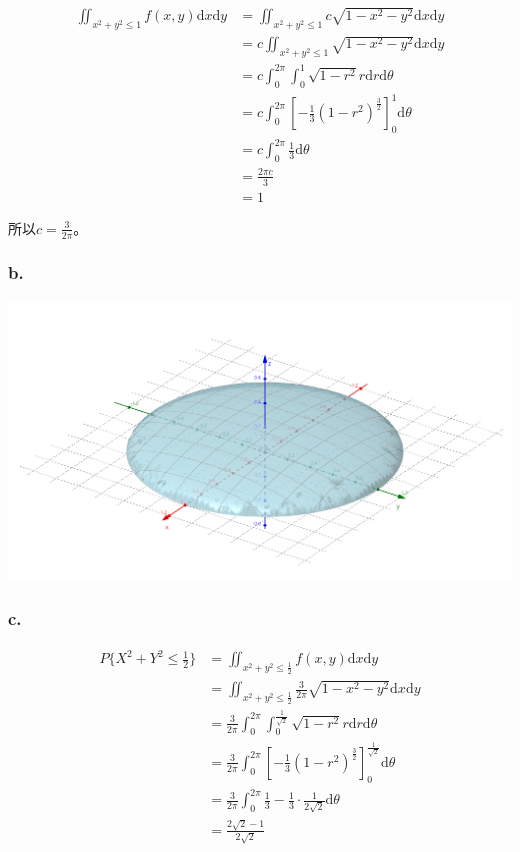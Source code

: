 \documentclass[a4paper,12pt]{ctexart}
\begin{document}
\begin{align*}
	\iint_{x^2 + y^2 \leq 1} f(x,y) \mathrm{d}x \mathrm{d}y &= \iint_{x^2 + y^2 \leq 1} c \sqrt{1 - x^2 - y^2} \mathrm{d}x \mathrm{d}y \\
	&= c \iint_{x^2 + y^2 \leq 1} \sqrt{1 - x^2 - y^2} \mathrm{d}x \mathrm{d}y \\
	&= c \int_{0}^{2\pi} \int_{0}^{1} \sqrt{1 - r^2} r \mathrm{d}r \mathrm{d}\theta \\
	&= c \int_{0}^{2\pi} \left[-\frac{1}{3} (1 - r^2)^{\frac{3}{2}}\right]_{0}^{1} \mathrm{d}\theta \\
	&= c \int_{0}^{2\pi} \frac{1}{3} \mathrm{d}\theta \\
	&= \frac{2\pi c}{3} \\
	&= 1
\end{align*}

所以$c = \frac{3}{2\pi}$。

\subsubsection*{b.}

\begin{center}
	\includegraphics[width = \textwidth]{3D-plot.png}
\end{center}

\subsubsection*{c.}

\begin{align*}
	P\{X^2 + Y^2 \leq \frac{1}{2}\} &= \iint_{x^2 + y^2 \leq \frac{1}{2}} f(x,y) \mathrm{d}x \mathrm{d}y \\
	&= \iint_{x^2 + y^2 \leq \frac{1}{2}} \frac{3}{2\pi} \sqrt{1 - x^2 - y^2} \mathrm{d}x \mathrm{d}y \\
	&= \frac{3}{2\pi} \int_{0}^{2\pi} \int_{0}^{\frac{1}{\sqrt{2}}} \sqrt{1 - r^2} r \mathrm{d}r \mathrm{d}\theta \\
	&= \frac{3}{2\pi} \int_{0}^{2\pi} \left[-\frac{1}{3} (1 - r^2)^{\frac{3}{2}}\right]_{0}^{\frac{1}{\sqrt{2}}} \mathrm{d}\theta \\
	&= \frac{3}{2\pi} \int_{0}^{2\pi} \frac{1}{3} - \frac{1}{3} \cdot \frac{1}{2\sqrt{2}} \mathrm{d}\theta \\
	&= \frac{2\sqrt{2} - 1}{2\sqrt{2}}
\end{align*}
\end{document}

